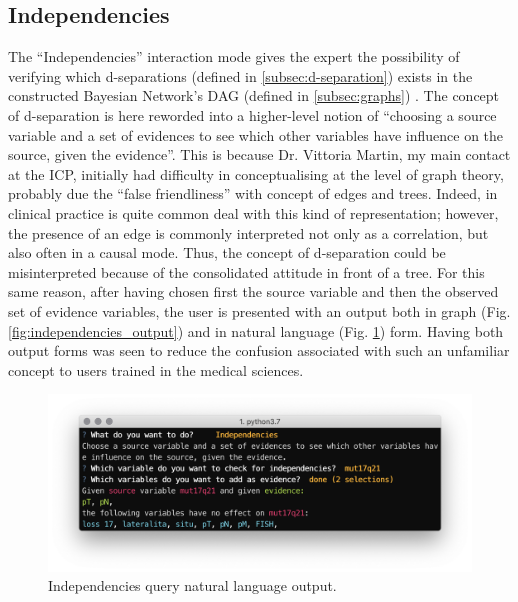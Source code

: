 \subsection{Independencies} \label{subsec:independencies-query}
The \enquote{Independencies} interaction mode gives the expert the possibility of verifying which d-separations (defined in \ref{subsec:d-separation}) exists in the constructed Bayesian Network's DAG (defined in \ref{subsec:graphs}) .
The concept of d-separation is here reworded into a higher-level notion of \enquote{choosing a source variable and a set of evidences to see which other variables have influence on the source, given the evidence}.
This is because Dr. Vittoria Martin, my main contact at the ICP, initially had difficulty in conceptualising at the level of graph theory, probably due the \enquote{false friendliness} with concept of edges and trees. 
Indeed, in clinical practice is quite common deal with this kind of representation; however, the presence of an edge is commonly interpreted not only as a correlation, but also often in a causal mode. 
Thus, the concept of d-separation could be misinterpreted because of the consolidated attitude in front of a tree.
For this same reason, after having chosen first the source variable and then the observed set of evidence variables, the user is presented with an output both in graph (Fig. \ref{fig:independencies_output}) and in natural language (Fig. \ref{fig:sw_2_independencies}) form.
Having both output forms was seen to reduce the confusion associated with such an unfamiliar concept to users trained in the medical sciences.

\begin{figure}[htbp]
\centerline{\includegraphics[width=\columnwidth]{results/images/sw_2_independencies}}
\caption{Independencies query natural language output.}
\label{fig:sw_2_independencies}
\end{figure}

